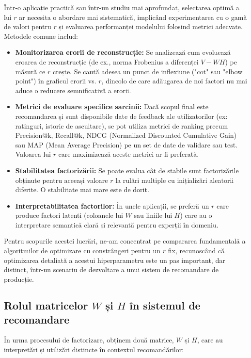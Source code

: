 \documentclass[12pt,a4paper]{article}
\begin{document}
	Într-o aplicație practică sau într-un studiu mai aprofundat, selectarea optimă a lui $r$ ar necesita o abordare mai sistematică, implicând experimentarea cu o gamă de valori pentru $r$ și evaluarea performanței modelului folosind metrici adecvate. Metodele comune includ:
	\begin{itemize}
		\item \textbf{Monitorizarea erorii de reconstrucție:} Se analizează cum evoluează eroarea de reconstrucție (de ex., norma Frobenius a diferenței $V - WH$) pe măsură ce $r$ crește. Se caută adesea un punct de inflexiune ("cot" sau "elbow point") în graficul erorii vs. $r$, dincolo de care adăugarea de noi factori nu mai aduce o reducere semnificativă a erorii.
		\item \textbf{Metrici de evaluare specifice sarcinii:} Dacă scopul final este recomandarea și sunt disponibile date de feedback ale utilizatorilor (ex: ratinguri, istoric de ascultare), se pot utiliza metrici de ranking precum Precision@k, Recall@k, NDCG (Normalized Discounted Cumulative Gain) sau MAP (Mean Average Precision) pe un set de date de validare sau test. Valoarea lui $r$ care maximizează aceste metrici ar fi preferată.
		\item \textbf{Stabilitatea factorizării:} Se poate evalua cât de stabile sunt factorizările obținute pentru aceeași valoare $r$ la rulări multiple cu inițializări aleatorii diferite. O stabilitate mai mare este de dorit.
		\item \textbf{Interpretabilitatea factorilor:} În unele aplicații, se preferă un $r$ care produce factori latenti (coloanele lui $W$ sau liniile lui $H$) care au o interpretare semantică clară și relevantă pentru experții în domeniu.
	\end{itemize}
	Pentru scopurile acestei lucrări, ne-am concentrat pe compararea fundamentală a algoritmilor de optimizare cu constrângeri pentru un $r$ fix, recunoscând că optimizarea detaliată a acestui hiperparametru este un pas important, dar distinct, într-un scenariu de dezvoltare a unui sistem de recomandare de producție.
	
	\subsection{Rolul matricelor $W$ și $H$ în sistemul de recomandare}
	În urma procesului de factorizare, obținem două matrice, $W$ și $H$, care au interpretări și utilizări distincte în contextul recomandărilor:
	
\end{document}
